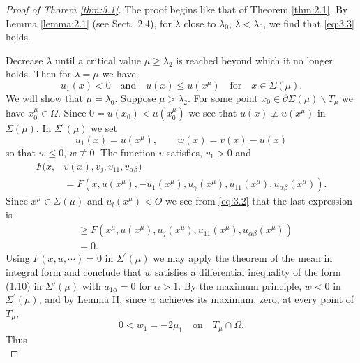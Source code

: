 \begin{proof}[Proof of Thorem \ref{thm:3.1}] 
  The proof begins like that of Theorem \ref{thm:2.1}. By Lemma \ref{lemma:2.1} (see Sect.~2.4), 
  for $\lambda$ close to $\lambda_0$, $\lambda<\lambda_0$, we find that \eqref{eq:3.3} holds.
  
  Decrease $\lambda$ until a critical value $\mu\geq \lambda_2$ is reached beyond which it no longer holds. Then for $\lambda=\mu$ we have
  \begin{equation}\label{3.5}
    u_1(x)<0\quad\text{and}\quad u(x)\leq  u(x^{\mu})\quad\text{for}\quad x\in\Sigma(\mu).
  \end{equation}
  We will show that $\mu=\lambda_0$. Suppose $\mu>\lambda_2$. For some point $x_0\in\partial\Sigma(\mu)\backslash T_{\mu}$ we have $x_0^{\mu}\in\Omega$. Since $0=u(x_0)<u(x_0^{\mu})$ we see that $u(x)\not\equiv u(x^{\mu})$ in $\Sigma(\mu)$. In $\Sigma^{\prime}(\mu)$ we set
  \begin{equation}\label{eq:3.6}
    u_1(x)=u(x^{\mu}),\qquad w(x)=v(x)-u(x)
  \end{equation}
  so that $w\leq 0$, $w\not\equiv0$. The function $v$ satisfies, $v_1>0$ and
  \begin{equation}\label{eq:3.7}
    \begin{aligned}
      F(x,&v(x),v_j,v_{11},v_{\alpha\beta})\\
      &=F(x,u(x^{\mu}),-u_1(x^{\mu}),u_{\gamma}(x^{\mu}),u_{11}(x^{\mu}),u_{\alpha\beta}(x^{\mu})).
    \end{aligned}
  \end{equation}
  Since $x^{\mu}\in\Sigma(\mu)$ and $u_l(x^{\mu})<O$ we see from \eqref{eq:3.2} that the last expression is
  \begin{equation}\label{eq:3.8}
    \begin{aligned}
      &\geq  F(x^{\mu},u(x^{\mu}),u_j(x^{\mu}),u_{11}(x^{\mu}),u_{\alpha\beta}(x^{\mu}))\\
      &=0.
    \end{aligned}
  \end{equation}
  Using $F(x, u, \cdots)=0$ in $\Sigma^{\prime}(\mu)$ we may apply the theorem of the mean in integral form and conclude that $w$ satisfies a differential inequality of the form (1.10) in $\Sigma\prime(\mu)$ with $ a_{1\alpha}=0 $ for $\alpha > 1$.
  By the maximum principle, $w < 0$ in $\Sigma^{\prime}(\mu)$, and by Lemma H, since $w$ achieves its maximum, zero, at every point of $T_{\mu}$,
  \[0<w_1=-2\mu_1 \quad\text{on}\quad T_{\mu}\cap\Omega.\]
  Thus
  \begin{equation}\label{eq:3.9}

\end{equation}
\end{proof}
